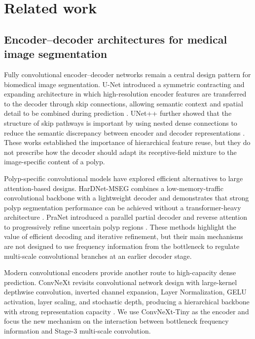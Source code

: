 \section{Related work}\label{related-work}

\subsection{Encoder--decoder architectures for medical image segmentation}

Fully convolutional encoder--decoder networks remain a central design pattern
for biomedical image segmentation. U-Net introduced a symmetric contracting
and expanding architecture in which high-resolution encoder features are
transferred to the decoder through skip connections, allowing semantic context
and spatial detail to be combined during prediction \cite{unet}. UNet++ further
showed that the structure of skip pathways is important by using nested dense
connections to reduce the semantic discrepancy between encoder and decoder
representations \cite{unetpp}. These works established the importance of
hierarchical feature reuse, but they do not prescribe how the decoder should
adapt its receptive-field mixture to the image-specific content of a polyp.

Polyp-specific convolutional models have explored efficient alternatives to
large attention-based designs. HarDNet-MSEG combines a low-memory-traffic
convolutional backbone with a lightweight decoder and demonstrates that strong
polyp segmentation performance can be achieved without a transformer-heavy architecture
\cite{hardnetmseg}. PraNet introduced a parallel partial decoder and reverse
attention to progressively refine uncertain polyp regions \cite{pranet}. These
methods highlight the value of efficient decoding and iterative refinement, but
their main mechanisms are not designed to use frequency information from the
bottleneck to regulate multi-scale convolutional branches at an earlier decoder
stage.

Modern convolutional encoders provide another route to high-capacity dense
prediction. ConvNeXt revisits convolutional network design with large-kernel
depthwise convolution, inverted channel expansion, Layer Normalization, GELU
activation, layer scaling, and stochastic depth, producing a hierarchical
backbone with strong representation capacity \cite{convnext}. We use
ConvNeXt-Tiny as the encoder and focus the new mechanism on the interaction
between bottleneck frequency information and Stage-3 multi-scale convolution.

